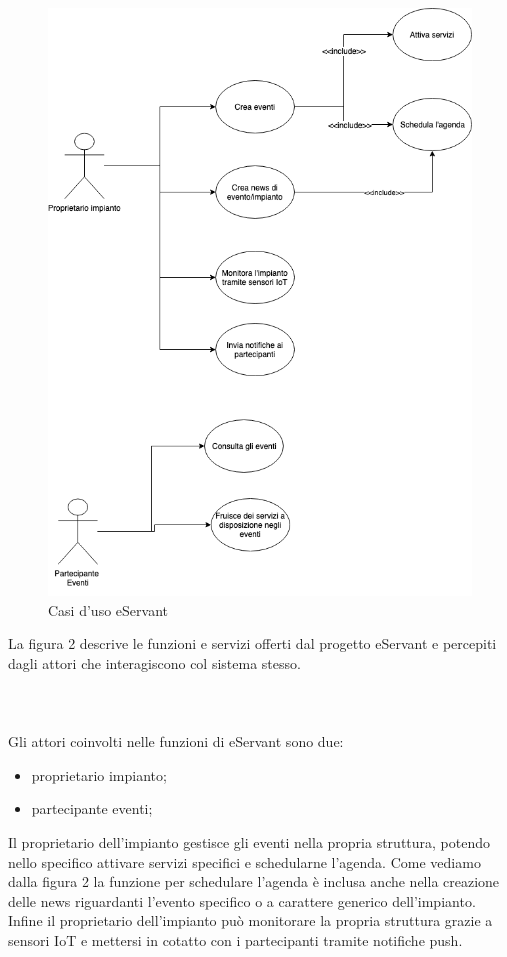 \begin{figure}[h!]
    \centering  
    \caption{Casi d'uso eServant}
    \includegraphics[scale=0.5]{img/cap1/casidiuso}
\end{figure}
La figura 2 descrive le funzioni e servizi offerti dal progetto eServant e percepiti dagli attori che interagiscono col sistema stesso.
\\\\\\\\Gli attori coinvolti nelle funzioni di eServant sono due:
\begin{itemize}
    \item proprietario impianto;
    \item partecipante eventi;
\end{itemize}

Il proprietario dell'impianto gestisce gli eventi nella propria struttura, potendo nello specifico attivare servizi specifici e schedularne l'agenda.
Come vediamo dalla figura 2 la funzione per schedulare l'agenda è inclusa anche nella creazione delle news riguardanti l'evento specifico o a
carattere generico dell'impianto.
Infine il proprietario dell'impianto può monitorare la propria struttura grazie a sensori IoT e mettersi in cotatto con i partecipanti tramite notifiche push.

